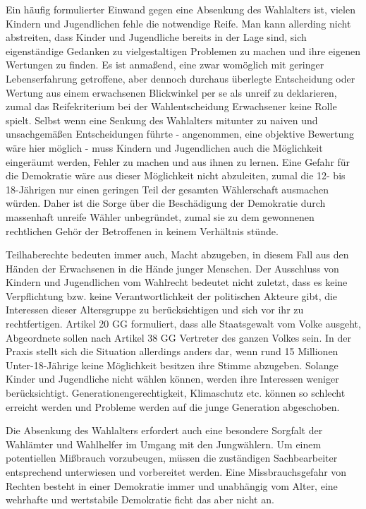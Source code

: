 {Ein häufig formulierter Einwand gegen eine Absenkung des Wahlalters ist, vielen Kindern und Jugendlichen fehle die notwendige Reife. Man kann allerding nicht abstreiten, dass Kinder und Jugendliche bereits in der Lage sind, sich eigenständige Gedanken zu vielgestaltigen Problemen zu machen und ihre eigenen Wertungen zu finden. Es ist anmaßend, eine zwar womöglich mit geringer Lebenserfahrung getroffene, aber dennoch durchaus überlegte Entscheidung oder Wertung aus einem erwachsenen Blickwinkel per se als unreif zu deklarieren, zumal das Reifekriterium bei der Wahlentscheidung Erwachsener keine Rolle spielt. Selbst wenn eine Senkung des Wahlalters mitunter zu naiven und unsachgemäßen Entscheidungen führte - angenommen, eine objektive Bewertung wäre hier möglich - muss Kindern und Jugendlichen auch die Möglichkeit eingeräumt werden, Fehler zu machen und aus ihnen zu lernen. Eine Gefahr für die Demokratie wäre aus dieser Möglichkeit nicht abzuleiten, zumal die 12- bis 18-Jährigen nur einen geringen Teil der gesamten Wählerschaft ausmachen würden. Daher ist die Sorge über die Beschädigung der Demokratie durch massenhaft unreife Wähler unbegründet, zumal sie zu dem gewonnenen rechtlichen Gehör der Betroffenen in keinem Verhältnis stünde.

Teilhaberechte bedeuten immer auch, Macht abzugeben, in diesem Fall aus den Händen der Erwachsenen in die Hände junger Menschen. Der Ausschluss von Kindern und Jugendlichen vom Wahlrecht bedeutet nicht zuletzt, dass es keine Verpflichtung bzw. keine Verantwortlichkeit der politischen Akteure gibt, die Interessen dieser Altersgruppe zu berücksichtigen und sich vor ihr zu rechtfertigen. Artikel 20 GG formuliert, dass alle Staatsgewalt vom Volke ausgeht, Abgeordnete sollen nach Artikel 38 GG Vertreter des ganzen Volkes sein. In der Praxis stellt sich die Situation allerdings anders dar, wenn rund 15 Millionen Unter-18-Jährige keine Möglichkeit besitzen ihre Stimme abzugeben. Solange Kinder und Jugendliche nicht wählen können, werden ihre Interessen weniger berücksichtigt. Generationengerechtigkeit, Klimaschutz etc. können so schlecht erreicht werden und Probleme werden auf die junge Generation abgeschoben.

Die Absenkung des Wahlalters erfordert auch eine besondere Sorgfalt der Wahlämter und Wahlhelfer im Umgang mit den Jungwählern. Um einem potentiellen Mißbrauch vorzubeugen, müssen die zuständigen Sachbearbeiter entsprechend unterwiesen und vorbereitet werden. Eine Missbrauchsgefahr von Rechten besteht in einer Demokratie immer und unabhängig vom Alter, eine wehrhafte und wertstabile Demokratie ficht das aber nicht an.

}
